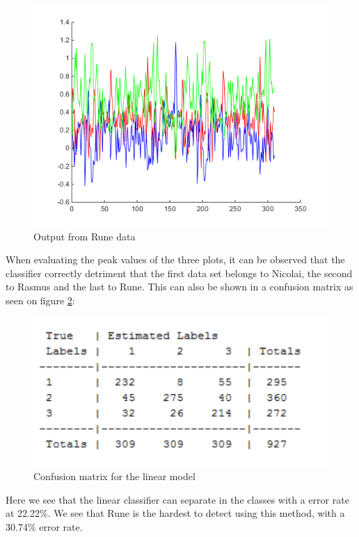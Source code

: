 \begin{figure}[H]
  \includegraphics[width=\linewidth]{billeder/oneofkval3}
  \caption{Output from Rune data}\label{fig:oneofkval3}
\endminipage
\end{figure}
When evaluating the peak values of the three plots, it can be observed that the classifier correctly detriment that the first data set belongs to Nicolai, the second to Rasmus and the last to Rune. This can also be shown in a confusion matrix as seen on figure \ref{fig:conmatlin}: 

\begin{figure}[H]
\centering
\includegraphics[scale=0.8]{billeder/conmatlin}
\caption{Confusion matrix for the linear model }
\label{fig:conmatlin}
\end{figure}

Here we see that the linear classifier can separate in the classes with a error rate at 22.22\%. We see that Rune is the hardest to detect using this method, with a 30.74\% error rate. 

